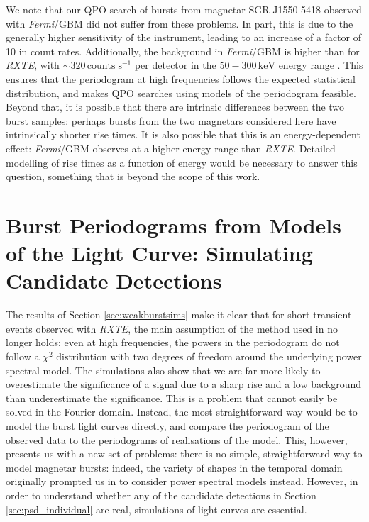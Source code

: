 \documentclass[numberedappendix]{emulateapj}
\newcommand{\project}[1]{\textsl{#1}}
\newcommand{\fermi}{\project{Fermi}}
\newcommand{\rxte}{\project{RXTE}}
\begin{document}
We note that our QPO search of bursts from magnetar SGR J1550-5418 observed with \fermi/GBM did not suffer from these problems. In part, this is due to the generally higher sensitivity of the instrument, leading to an increase of a factor of 10 in count rates. Additionally, the background in \fermi/GBM is higher than for \rxte, with $\sim 320 \, \mathrm{counts} \; \mathrm{s}^{-1}$ per detector in the $50 - 300 \, \mathrm{keV}$ energy range \citep{meegan2009}. This ensures that the periodogram at high frequencies follows the expected statistical distribution, and makes QPO searches using models of the periodogram feasible. Beyond that, it is possible that there are intrinsic differences between the two burst samples: perhaps bursts from the two magnetars considered here have intrinsically shorter rise times. It is also possible that this is an energy-dependent effect: \fermi/GBM observes at a higher energy range than \rxte. Detailed modelling of rise times as a function of energy would be necessary to answer this question, something that is beyond the scope of this work.
\label{sec:dnest}

\section{Burst Periodograms from Models of the Light Curve: Simulating Candidate Detections}


The results of Section \ref{sec:weakburstsims} make it clear that for short transient events observed with \rxte, the main assumption of the method used in \citet{huppenkothen2013} no longer holds: even at high frequencies, the powers in the periodogram do not follow a $\chi^2$ distribution with two degrees of freedom around the underlying power spectral model. The simulations also show that we are far more likely to overestimate the significance of a signal due to a sharp rise and a low background than underestimate the significance. This is a problem that cannot easily be solved in the Fourier domain. Instead, the most straightforward way would be to model the burst light curves directly, and compare the periodogram of the observed data to the periodograms of realisations of the model. This, however, presents us with a new set of problems: there is no simple, straightforward way to model magnetar bursts: indeed, the variety of shapes in the temporal domain originally prompted us in \citet{huppenkothen2013} to consider power spectral models instead. However, in order to understand whether any of the candidate detections in Section \ref{sec:psd_individual} are real, simulations of light curves are essential. 
\end{document}
